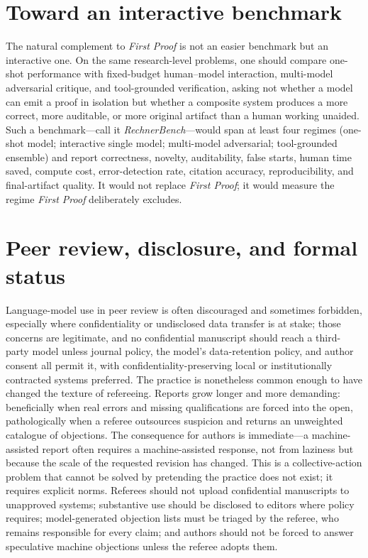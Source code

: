 \documentclass[
  aps,
  reprint,
  superscriptaddress,
  floatfix,
  nofootinbib,
  longbibliography
]{revtex4-2}
\begin{document}
\section{Toward an interactive benchmark}
\label{sec:benchmark}

The natural complement to \textit{First Proof} is not an easier benchmark but an
interactive one. On the same research-level problems, one should compare one-shot
performance with fixed-budget human--model interaction, multi-model adversarial
critique, and tool-grounded verification, asking not whether a model can emit a
proof in isolation but whether a composite system produces a more correct, more
auditable, or more original artifact than a human working unaided. Such a
benchmark---call it \emph{RechnerBench}---would span at least four regimes
(one-shot model; interactive single model; multi-model adversarial; tool-grounded
ensemble) and report correctness, novelty, auditability, false starts, human time
saved, compute cost, error-detection rate, citation accuracy, reproducibility,
and final-artifact quality. It would not replace \textit{First Proof}; it would
measure the regime \textit{First Proof} deliberately excludes.

\section{Peer review, disclosure, and formal status}
\label{sec:review}

Language-model use in peer review is often discouraged and sometimes forbidden,
especially where confidentiality or undisclosed data transfer is at stake; those
concerns are legitimate, and no confidential manuscript should reach a
third-party model unless journal policy, the model's data-retention policy, and
author consent all permit it, with confidentiality-preserving local or
institutionally contracted systems preferred. The practice is nonetheless common
enough to have changed the texture of refereeing. Reports grow longer and more
demanding: beneficially when real errors and missing qualifications are forced
into the open, pathologically when a referee outsources suspicion and returns an
unweighted catalogue of objections. The consequence for authors is
immediate---a machine-assisted report often requires a machine-assisted
response, not from laziness but because the scale of the requested revision has
changed. This is a collective-action problem that cannot be solved by pretending
the practice does not exist; it requires explicit norms. Referees should not
upload confidential manuscripts to unapproved systems; substantive use should be
disclosed to editors where policy requires; model-generated objection lists must
be triaged by the referee, who remains responsible for every claim; and authors
should not be forced to answer speculative machine objections unless the referee
adopts them.
\end{document}
